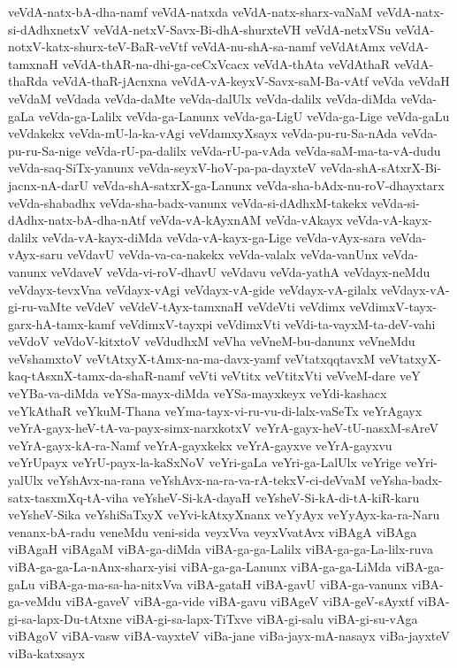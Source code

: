 {veVdA-natx-bA-dha-namf
veVdA-natxda
veVdA-natx-sharx-vaNaM
veVdA-natx-si-dAdhxnetxV
veVdA-netxV-Savx-Bi-dhA-shurxteVH
veVdA-netxVSu
veVdA-notxV-katx-shurx-teV-BaR-veVtf
veVdA-nu-shA-sa-namf
veVdAtAmx
veVdA-tamxnaH
veVdA-thAR-na-dhi-ga-ceCxVcacx
veVdA-thAta
veVdAthaR
veVdA-thaRda
veVdA-thaR-jAcnxna
veVdA-vA-keyxV-Savx-saM-Ba-vAtf
veVda
veVdaH
veVdaM
veVdada
veVda-daMte
veVda-dalUlx
veVda-dalilx
veVda-diMda
veVda-gaLa
veVda-ga-Lalilx
veVda-ga-Lanunx
veVda-ga-LigU
veVda-ga-Lige
veVda-gaLu
veVdakekx
veVda-mU-la-ka-vAgi
veVdamxyXsayx
veVda-pu-ru-Sa-nAda
veVda-pu-ru-Sa-nige
veVda-rU-pa-dalilx
veVda-rU-pa-vAda
veVda-saM-ma-ta-vA-dudu
veVda-saq-SiTx-yanunx
veVda-seyxV-hoV-pa-pa-dayxteV
veVda-shA-sAtxrX-Bi-jacnx-nA-darU
veVda-shA-satxrX-ga-Lanunx
veVda-sha-bAdx-nu-roV-dhayxtarx
veVda-shabadhx
veVda-sha-badx-vanunx
veVda-si-dAdhxM-takekx
veVda-si-dAdhx-natx-bA-dha-nAtf
veVda-vA-kAyxnAM
veVda-vAkayx
veVda-vA-kayx-dalilx
veVda-vA-kayx-diMda
veVda-vA-kayx-ga-Lige
veVda-vAyx-sara
veVda-vAyx-saru
veVdavU
veVda-va-ca-nakekx
veVda-valalx
veVda-vanUnx
veVda-vanunx
veVdaveV
veVda-vi-roV-dhavU
veVdavu
veVda-yathA
veVdayx-neMdu
veVdayx-tevxVna
veVdayx-vAgi
veVdayx-vA-gide
veVdayx-vA-gilalx
veVdayx-vA-gi-ru-vaMte
veVdeV
veVdeV-tAyx-tamxnaH
veVdeVti
veVdimx
veVdimxV-tayx-garx-hA-tamx-kamf
veVdimxV-tayxpi
veVdimxVti
veVdi-ta-vayxM-ta-deV-vahi
veVdoV
veVdoV-kitxtoV
veVdudhxM
veVha
veVneM-bu-danunx
veVneMdu
veVshamxtoV
veVtAtxyX-tAmx-na-ma-davx-yamf
veVtatxqqtavxM
veVtatxyX-kaq-tAsxnX-tamx-da-shaR-namf
veVti
veVtitx
veVtitxVti
veVveM-dare
veY
veYBa-va-diMda
veYSa-mayx-diMda
veYSa-mayxkeyx
veYdi-kashacx
veYkAthaR
veYkuM-Thana
veYma-tayx-vi-ru-vu-di-lalx-vaSeTx
veYrAgayx
veYrA-gayx-heV-tA-va-payx-simx-narxkotxV
veYrA-gayx-heV-tU-nasxM-sAreV
veYrA-gayx-kA-ra-Namf
veYrA-gayxkekx
veYrA-gayxve
veYrA-gayxvu
veYrUpayx
veYrU-payx-la-kaSxNoV
veYri-gaLa
veYri-ga-LalUlx
veYrige
veYri-yalUlx
veYshAvx-na-rana
veYshAvx-na-ra-va-rA-tekxV-ci-deVvaM
veYsha-badx-satx-tasxmXq-tA-viha
veYsheV-Si-kA-dayaH
veYsheV-Si-kA-di-tA-kiR-karu
veYsheV-Sika
veYshiSaTxyX
veYvi-kAtxyXnanx
veYyAyx
veYyAyx-ka-ra-Naru
venanx-bA-radu
veneMdu
veni-sida
veyxVva
veyxVvatAvx
viBAgA
viBAga
viBAgaH
viBAgaM
viBA-ga-diMda
viBA-ga-ga-Lalilx
viBA-ga-ga-La-lilx-ruva
viBA-ga-ga-La-nAnx-sharx-yisi
viBA-ga-ga-Lanunx
viBA-ga-ga-LiMda
viBA-ga-gaLu
viBA-ga-ma-sa-ha-nitxVva
viBA-gataH
viBA-gavU
viBA-ga-vanunx
viBA-ga-veMdu
viBA-gaveV
viBA-ga-vide
viBA-gavu
viBAgeV
viBA-geV-sAyxtf
viBA-gi-sa-lapx-Du-tAtxne
viBA-gi-sa-lapx-TiTxve
viBA-gi-salu
viBA-gi-su-vAga
viBAgoV
viBA-vasw
viBA-vayxteV
viBa-jane
viBa-jayx-mA-nasayx
viBa-jayxteV
viBa-katxsayx
}
